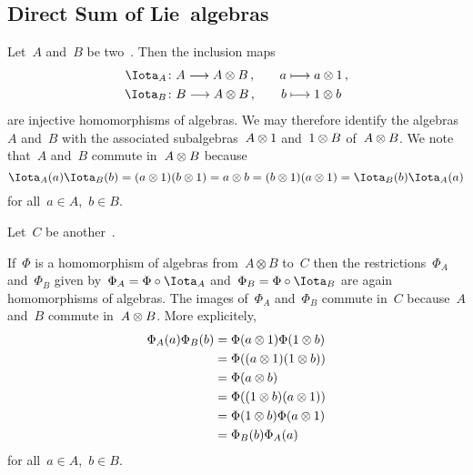 \subsection{Direct Sum of Lie~algebras}

\begin{recall}
  \label{homomorphism out of a tensor product}
  Let~$A$ and~$B$ be two~{\algebras{$\kf$}}.
  Then the inclusion maps
  \begin{alignat*}{2}
    \Iota_A
    &\colon
    A
    \to
    A \tensor B \,,
    &
    \quad
    a
    &\mapsto
    a \tensor 1 \,,
    \\
    \Iota_B
    &\colon
    B
    \to
    A \tensor B \,,
    &
    \quad
    b
    &\mapsto
    1 \tensor b
  \end{alignat*}
  are injective homomorphisms of algebras.
  We may therefore identify the algebras~$A$ and~$B$ with the associated subalgebras~$A \otimes 1$ and~$1 \otimes B$ of~$A \otimes B$.
  We note that~$A$ and~$B$ commute in~$A \otimes B$ because
  \[
    \Iota_A(a) \Iota_B(b)
    =
    (a \tensor 1) (b \tensor 1)
    =
    a \tensor b
    =
    (b \tensor 1) (a \tensor 1)
    =
    \Iota_B(b) \Iota_A(a)
  \]
  for all~$a \in A$,~$b \in B$.
  
  Let~$C$ be another~{\algebra{$\kf$}}.
  
  If~$\Phi$ is a homomorphism of algebras from~$A \otimes B$ to~$C$ then the restrictions~$\Phi_A$ and~$\Phi_B$ given by~$\Phi_A = \Phi \circ \Iota_A$ and~$\Phi_B = \Phi \circ \Iota_B$ are again homomorphisms of algebras.
  The images of~$\Phi_A$ and~$\Phi_B$ commute in~$C$ because~$A$ and~$B$ commute in~$A \otimes B$.
  More explicitely,
  \begin{align*}
    \Phi_A(a) \Phi_B(b)
    &=
    \Phi(a \otimes 1) \Phi(1 \otimes b)
    \\
    &=
    \Phi( (a \otimes 1) (1 \otimes b) )
    \\
    &=
    \Phi( a \otimes b )
    \\
    &=
    \Phi( (1 \otimes b) (a \otimes 1) )
    \\
    &=
    \Phi(1 \otimes b) \Phi(a \otimes 1)
    \\
    &=
    \Phi_B(b) \Phi_A(a)
  \end{align*}
  for all~$a \in A$,~$b \in B$.
  

\end{recall}
